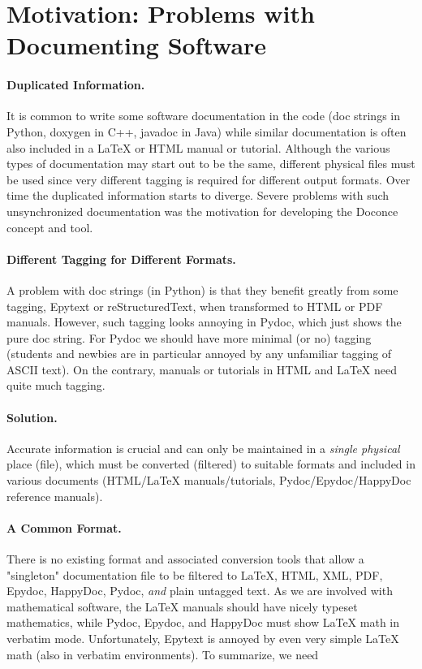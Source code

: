 \documentclass{article}
\begin{document}
\section{Motivation: Problems with Documenting Software}


\paragraph{Duplicated Information.}
It is common to write some software
documentation in the code (doc strings in Python, doxygen in C++,
javadoc in Java) while similar documentation is often also included in
a {\LaTeX} or HTML manual or tutorial. Although the various types of
documentation may start out to be the same, different physical files
must be used since very different tagging is required for different
output formats. Over time the duplicated information starts to
diverge. Severe problems with such unsynchronized documentation was
the motivation for developing the Doconce concept and tool.

\paragraph{Different Tagging for Different Formats.}
A problem with doc
strings (in Python) is that they benefit greatly from some tagging,
Epytext or reStructuredText, when transformed to HTML or PDF
manuals. However, such tagging looks annoying in Pydoc, which just
shows the pure doc string. For Pydoc we should have more minimal (or
no) tagging (students and newbies are in particular annoyed by any
unfamiliar tagging of ASCII text). On the contrary, manuals or
tutorials in HTML and {\LaTeX} need quite much tagging.

\paragraph{Solution.}
Accurate information is crucial and can only be
maintained in a \emph{single physical} place (file), which must be
converted (filtered) to suitable formats and included in various
documents (HTML/{\LaTeX} manuals/tutorials, Pydoc/Epydoc/HappyDoc
reference manuals).

\paragraph{A Common Format.}
There is no existing format and associated
conversion tools that allow a "singleton" documentation file to be
filtered to {\LaTeX}, HTML, XML, PDF, Epydoc, HappyDoc, Pydoc, \emph{and} plain
untagged text. As we are involved with mathematical software, the
{\LaTeX} manuals should have nicely typeset mathematics, while Pydoc,
Epydoc, and HappyDoc must show {\LaTeX} math in verbatim mode.
Unfortunately, Epytext is annoyed by even very simple {\LaTeX} math (also
in verbatim environments). To summarize, we need
\end{document}
